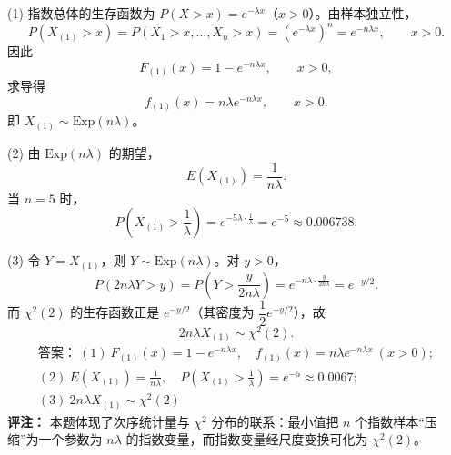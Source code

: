 (1) 指数总体的生存函数为 $P(X>x)=e^{-\lambda x}$（$x>0$）。由样本独立性，
\[
P(X_{(1)}>x)=P(X_1>x,\ldots,X_n>x)
=\left(e^{-\lambda x}\right)^n=e^{-n\lambda x},\qquad x>0.
\]
因此
\[
F_{(1)}(x)=1-e^{-n\lambda x},\qquad x>0,
\]
求导得
\[
f_{(1)}(x)=n\lambda e^{-n\lambda x},\qquad x>0.
\]
即 $X_{(1)}\sim\mathrm{Exp}(n\lambda)$。

(2) 由 $\mathrm{Exp}(n\lambda)$ 的期望，
\[
E(X_{(1)})=\frac{1}{n\lambda}.
\]
当 $n=5$ 时，
\[
P\!\left(X_{(1)}>\frac1\lambda\right)
=e^{-5\lambda\cdot\frac1\lambda}=e^{-5}\approx0.006738.
\]

(3) 令 $Y=X_{(1)}$，则 $Y\sim\mathrm{Exp}(n\lambda)$。对 $y>0$，
\[
P(2n\lambda Y>y)
=P\!\left(Y>\frac{y}{2n\lambda}\right)
=e^{-n\lambda\cdot\frac{y}{2n\lambda}}
=e^{-y/2}.
\]
而 $\chi^2(2)$ 的生存函数正是 $e^{-y/2}$（其密度为 $\dfrac12e^{-y/2}$），故
\[
2n\lambda X_{(1)}\sim\chi^2(2).
\]
\[
\boxed{\begin{gathered}
\text{答案：}\ (1)\ F_{(1)}(x)=1-e^{-n\lambda x},\quad f_{(1)}(x)=n\lambda e^{-n\lambda x}\ (x>0);\\
(2)\ E(X_{(1)})=\frac{1}{n\lambda},\quad P\!\left(X_{(1)}>\frac1\lambda\right)=e^{-5}\approx0.0067;\\
(3)\ 2n\lambda X_{(1)}\sim\chi^2(2)
\end{gathered}}
\]
\textbf{评注：} 本题体现了次序统计量与 $\chi^2$ 分布的联系：最小值把 $n$ 个指数样本“压缩”为一个参数为 $n\lambda$ 的指数变量，而指数变量经尺度变换可化为 $\chi^2(2)$。
\else \answerarea[8] \fi%
